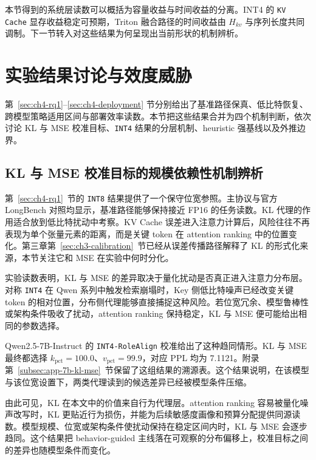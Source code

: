 本节得到的系统层读数可以概括为容量收益与时间收益的分离。INT4 的 \texttt{KV Cache} 显存收益稳定可预期，Triton 融合路径的时间收益由 $H_{kv}$ 与序列长度共同调制。下一节转入对这些结果为何呈现出当前形状的机制辨析。

\section{实验结果讨论与效度威胁}
\label{sec:ch4-discussion}
\label{sec:exp-discussion}

第~\ref{sec:ch4-rq1}--\ref{sec:ch4-deployment} 节分别给出了基准路径保真、低比特恢复、跨模型策略适用区间与部署效率读数。本节把这些结果合并为四个机制判断，依次讨论 KL 与 MSE 校准目标、\texttt{INT4} 结果的分层机制、heuristic 强基线以及外推边界。

\subsection{KL 与 MSE 校准目标的规模依赖性机制辨析}
\label{subsec:ch4-disc-kl-mse}

第~\ref{sec:ch4-rq1}~节的 \texttt{INT8} 结果提供了一个保守位宽参照。主协议与官方 LongBench 对照均显示，基准路径能够保持接近 FP16 的任务读数。KL 代理的作用适合放到低比特扰动中考察。KV Cache 误差进入注意力计算后，风险往往不再表现为单个张量元素的距离，而是关键 token 在 attention ranking 中的位置变化。第三章第~\ref{sec:ch3-calibration}~节已经从误差传播路径解释了 KL 的形式化来源，本节关注它和 MSE 在实验中何时分化。

实验读数表明，KL 与 MSE 的差异取决于量化扰动是否真正进入注意力分布层。对称 \texttt{INT4} 在 Qwen 系列中触发检索崩塌时，Key 侧低比特噪声已经改变关键 token 的相对位置，分布侧代理能够直接捕捉这种风险。若位宽冗余、模型鲁棒性或架构条件吸收了扰动，attention ranking 保持稳定，KL 与 MSE 便可能给出相同的参数选择。

Qwen2.5-7B-Instruct 的 \texttt{INT4-RoleAlign} 校准给出了这种趋同情形。KL 与 MSE 最终都选择 $k_{\mathrm{pct}}=100.0$、$v_{\mathrm{pct}}=99.9$，对应 PPL 均为 7.1121。附录第~\ref{subsec:app-7b-kl-mse}~节保留了这组结果的溯源表。这个结果说明，在该模型与该位宽设置下，两类代理读到的候选差异已经被模型条件压缩。

由此可见，KL 在本文中的价值来自行为代理层。attention ranking 容易被量化噪声改写时，KL 更贴近行为损伤，并能为后续敏感度画像和预算分配提供同源读数。模型规模、位宽或架构条件使扰动保持在稳定区间内时，KL 与 MSE 会逐步趋同。这个结果把 behavior-guided 主线落在可观察的分布偏移上，校准目标之间的差异也随模型条件而变化。

